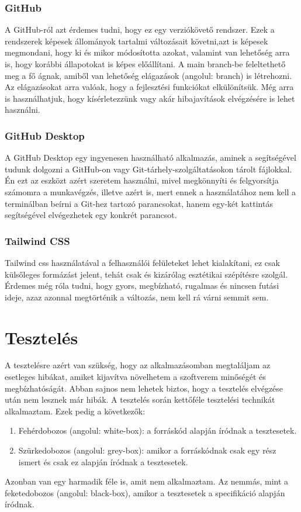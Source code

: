 \documentclass[]{thesis-ekf}
\theoremstyle{definition}
\theoremstyle{remark}
\begin{document}
	\subsection{GitHub}
		A GitHub-ról azt érdemes tudni, hogy ez egy verziókövető rendszer. Ezek a rendszerek képesek állományok tartalmi változásait követni,azt is képesek megmondani, hogy ki és mikor módosította azokat, valamint van lehetőség arra is, hogy korábbi állapotokat is képes előállítani. A main branch-be feleltethető meg a fő ágnak, amiből van lehetőség elágazások (angolul: branch) is létrehozni. Az elágazásokat arra valóak, hogy a fejlesztési funkciókat elkülönítsük. Még arra is használhatjuk, hogy kísérletezzünk vagy akár hibajavítások elvégzésére is lehet használni.
	\subsection{GitHub Desktop}
		A GitHub Desktop egy ingyenesen használható alkalmazás, aminek a segítségével tudunk dolgozni a GitHub-on vagy Git-tárhely-szolgáltatásokon tárolt fájlokkal. Én ezt az eszközt azért szeretem használni, mivel megkönnyíti és felgyorsítja számomra a munkavégzés, illetve azért is, mert ennek a használatához nem kell a terminálban beírni a Git-hez tartozó parancsokat, hanem egy-két kattintás segítségével elvégezhetek egy konkrét parancsot.
		\cite{GitHubDesktop}
	\subsection{Tailwind CSS}\label{sc-tailwind}
		Tailwind css használatával a felhasználói felületeket lehet kialakítani, ez csak külsőleges formázást jelent, tehát csak és kizárólag esztétikai szépítésre szolgál. Érdemes még róla tudni, hogy gyors, megbízható, rugalmas és nincsen futási ideje, azaz azonnal megtörténik a változás, nem kell rá várni semmit sem. \cite{tailwind}
	
	\chapter{Tesztelés}
		A tesztelésre azért van szükség, hogy az alkalmazásomban megtaláljam az esetleges hibákat, amiket kijavítva növelhetem a szoftverem minőségét és megbízhatóságát. Abban sajnos nem lehetek biztos, hogy a tesztelés elvégzése után nem lesznek már hibák. A tesztelés során kettőféle tesztelési technikát alkalmaztam. Ezek pedig a következők:
		\begin{enumerate}
			\item Fehérdobozos (angolul: white-box): a forráskód alapján íródnak a tesztesetek.
			\item Szürkedobozos (angolul: grey-box): amikor a forráskódnak csak egy rész ismert és csak ez alapján íródnak a tesztesetek.
		\end{enumerate}
		Azonban van egy harmadik féle is, amit nem alkalmaztam. Az nemmás, mint a feketedobozos (angolul: black-box), amikor a tesztesetek a specifikáció alapján íródnak.
		\cite[26-29.~oldal]{Kusper}
\end{document}
